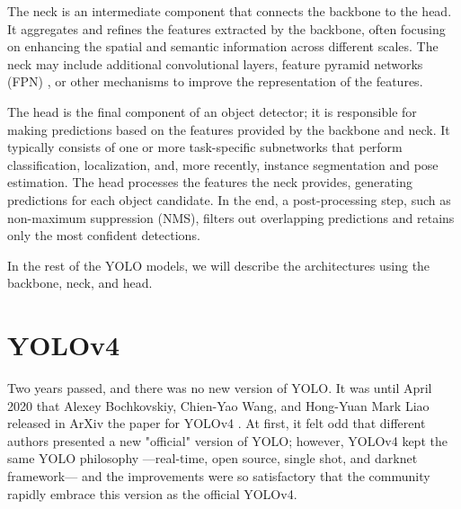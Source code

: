 \documentclass{article}
\begin{document}
The neck is an intermediate component that connects the backbone to the head. It aggregates and refines the features extracted by the backbone, often focusing on enhancing the spatial and semantic information across different scales. The neck may include additional convolutional layers, feature pyramid networks (FPN) \cite{lin2017feature}, or other mechanisms to improve the representation of the features.

The head is the final component of an object detector; it is responsible for making predictions based on the features provided by the backbone and neck. It typically consists of one or more task-specific subnetworks that perform classification, localization, and, more recently, instance segmentation and pose estimation. The head processes the features the neck provides, generating predictions for each object candidate. In the end, a post-processing step, such as non-maximum suppression (NMS), filters out overlapping predictions and retains only the most confident detections.

In the rest of the YOLO models, we will describe the architectures using the backbone, neck, and head.



\section{YOLOv4}


Two years passed, and there was no new version of YOLO. It was until April 2020 that Alexey Bochkovskiy, Chien-Yao Wang, and Hong-Yuan Mark Liao released in ArXiv the paper for YOLOv4 \cite{bochkovskiy2020yolov4}. At first, it felt odd that different authors presented a new "official" version of YOLO; however, YOLOv4 kept the same YOLO philosophy —real-time, open source, single shot, and darknet framework— and the improvements were so satisfactory that the community rapidly embrace this version as the official YOLOv4.
\end{document}
